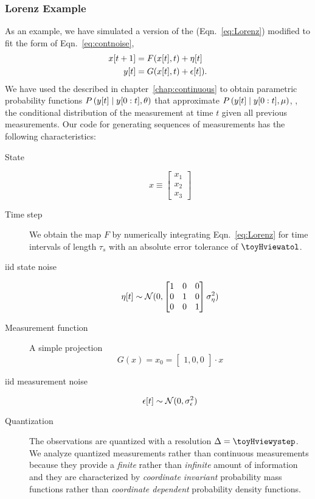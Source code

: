 \subsubsection{Lorenz Example}

As an example, we have simulated a version of the %
 (Eqn.~\eqref{eq:Lorenz}) modified to fit the
form of Eqn.~\eqref{eq:contnoise},
\begin{align*}
  {x}{[t+1]} &= F({x}{[t]},t) + {\eta}{[t]}\\
  {y}{[t]}   &= G({x}{[t]},t) + {\epsilon}{[t]}).
\end{align*}
We have used the  described in
chapter~\ref{chap:continuous} to obtain parametric probability
functions $P\left({y}{[t]}\mid y[0:t] , \theta \right)$ that
approximate $P\left({y}{[t]}\mid y[0:t], \mu \right)$, \ie, the
conditional distribution of the measurement at time $t$ given all
previous measurements.  Our code for generating sequences of
measurements has the following characteristics:
  \begin{description}
  \item[State] 
    \begin{equation*}
      x \equiv 
      \begin{bmatrix}
        x_1\\x_2\\x_3
      \end{bmatrix}
    \end{equation*}
  \item[Time step] We obtain the map $F$ by numerically integrating
    Eqn.~\eqref{eq:Lorenz} for time intervals of length $\tau_s$ with an
    absolute error tolerance of $\toyHviewatol$.
  \item[iid state noise] 
    \begin{equation*}
      {\eta}{[t]} \sim {\mathcal{N}}(0, \begin{bmatrix} 1 & 0 & 0\\0 & 1 &
        0\\0&0&1 \end{bmatrix} \sigma_\eta^2)
    \end{equation*}
  \item[Measurement function] A simple projection
    \begin{equation*}
      G(x) = x_0 = \begin{bmatrix} 1,0,0 \end{bmatrix} \cdot x
    \end{equation*}
  \item[iid measurement noise] 
    \begin{equation*}
      {\epsilon}{[t]} \sim {\mathcal{N}}(0, \sigma_\epsilon^2)
    \end{equation*}
  \item[Quantization] The observations are quantized with a resolution
    $\Delta=\toyHviewystep$.  We analyze quantized measurements rather than
    continuous measurements because they provide a \emph{finite} rather
    than \emph{infinite} amount of information and they are
    characterized by \emph{coordinate invariant} probability mass
    functions rather than \emph{coordinate dependent} probability
    density functions.
\end{description}
